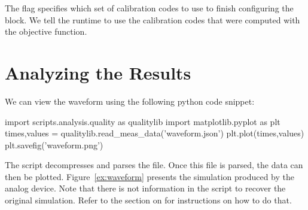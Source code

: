 The  flag specifies which set of calibration codes to use to finish
configuring the block. We tell the \grendel runtime to use the calibration codes
that were computed with the  objective function.

\section{Analyzing the Results}

We can view the waveform using the following python code snippet:

\begin{pysnippet}
  import scripts.analysis.quality as qualitylib
  import matplotlib.pyplot as plt
  times,values = qualitylib.read_meas_data('waveform.json')
  plt.plot(times,values)
  plt.savefig('waveform.png')
\end{pysnippet}

The  script decompresses and parses the  file. Once
this file is parsed, the data can then be plotted. Figure~\ref{ex:waveform} presents the
simulation produced by the analog device. Note that there is not information in
the \grendel script to recover the original simulation. Refer to the section on
\expdriver for instructions on how to do that.
